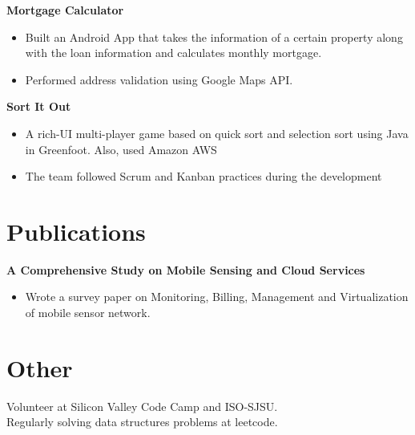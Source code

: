 \documentclass[margin]{res}
\begin{document}
\begin{resume}
 {\bf Mortgage Calculator }
 \begin{itemize} \itemsep -2pt  %
 \item Built an Android App that takes the information of a certain property along with the loan information and calculates monthly mortgage. 
 \item Performed address validation using Google Maps API.
 \end{itemize}
 
{\bf Sort It Out }
 \begin{itemize} \itemsep -2pt  %
 \item A rich-UI multi-player game based on quick sort and selection sort using Java in Greenfoot. Also, used Amazon AWS 
 \item The team followed Scrum and Kanban practices during the development 
 \end{itemize}
\section{Publications}
 
 {\bf A Comprehensive Study on Mobile Sensing and Cloud Services }
 \begin{itemize} \itemsep -2pt  %
\item Wrote a survey paper on Monitoring, Billing, Management and Virtualization of mobile sensor network.
  \end{itemize}
 

 
\section{Other}
 Volunteer at Silicon Valley Code Camp and ISO-SJSU.\\
 Regularly solving data structures problems at leetcode. 

\end{resume}
\end{document}
